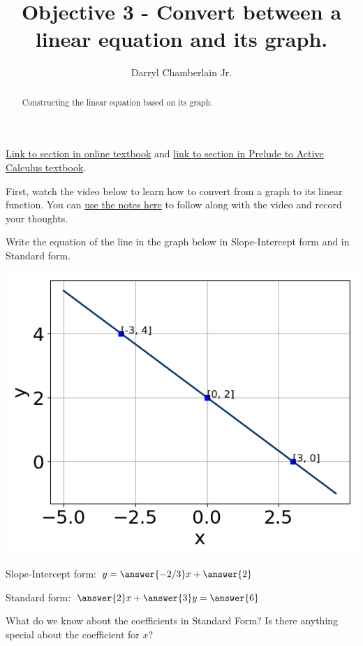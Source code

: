 \documentclass{ximera}
\author{Darryl Chamberlain Jr.}
\title{Objective 3 - Convert between a linear equation and its graph.}
\begin{document}
\begin{abstract}
Constructing the linear equation based on its graph. 
\end{abstract}
\maketitle

\href{https://cnx.org/contents/mwjClAV_@8.1:62_eXnY6@14/Linear-Equations-in-One-Variable}{Link to section in online textbook} and
\href{https://activecalculus.org/prelude/sec-changing-linear.html}{link to section in Prelude to Active Calculus textbook}.


First, watch the video below to learn how to convert from a graph to its linear function. You can \href{http://people.clas.ufl.edu/dchamberlain31/files/Objective-3-Converting-between-representations.pdf}{use the notes here} to follow along with the video and record your thoughts.



\begin{question}
Write the equation of the line in the graph below in Slope-Intercept form and in Standard form. 

\includegraphics{question1.png}

Slope-Intercept form: $y = \answer{-2/3}x + \answer{2}$

Standard form: $\answer{2} x + \answer{3} y = \answer{6}$

\begin{hint}
	What do we know about the coefficients in Standard Form? Is there anything special about the coefficient for $x$?
\end{hint}
\end{question}
\end{document}
